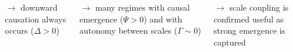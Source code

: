 \documentclass[a0paper]{tikzposter}
\begin{document}
\begin{columns}
{{			    $\rightarrow$ downward causation always occurs ($\Delta > 0$)
			    
			     \vspace{0.2cm}
			    
			     $\rightarrow$ many regimes with causal emergence ($\Psi > 0$) and with autonomy between scales ($\Gamma \sim 0$)
			     
			      \vspace{0.2cm}
			     
			     $\rightarrow$ scale coupling is confirmed useful as strong emergence is captured
			     
		      }
            
		}
		
\end{columns}
\end{document}

